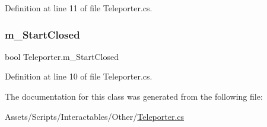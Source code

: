 Definition at line 11 of file Teleporter.\+cs.

\mbox{\label{class_teleporter_ad28abcff38d4c5e16ee1f5158bbcdae8}} 
\subsubsection{\texorpdfstring{m\+\_\+\+Start\+Closed}{m\_StartClosed}}
{\footnotesize\ttfamily bool Teleporter.\+m\+\_\+\+Start\+Closed}



Definition at line 10 of file Teleporter.\+cs.



The documentation for this class was generated from the following file\+:\begin{DoxyCompactItemize}
\item 
Assets/\+Scripts/\+Interactables/\+Other/\mbox{\hyperlink{_teleporter_8cs}{Teleporter.\+cs}}\end{DoxyCompactItemize}
